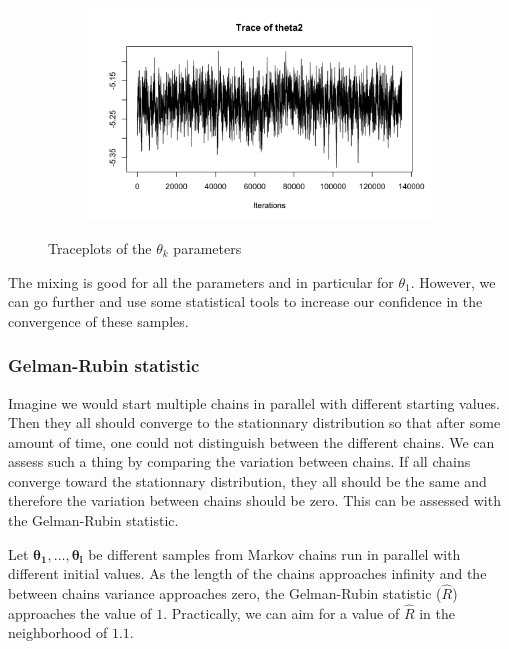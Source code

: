 \begin{figure}[H]
\begin{subfigure}{0.3\textwidth}
	\end{subfigure}
	\begin{subfigure}{0.3\textwidth}
		\centering
		\includegraphics{figures/metropolis_cw_traceplot_theta2}
	\end{subfigure}
	\caption{Traceplots of the $\theta_k$ parameters}
	\label{fig:metropolis-cw-traceplots}
\end{figure}

The mixing is good for all the parameters and in particular for $\theta_1$. However, we can go further and use some statistical tools to increase our confidence in the convergence of these samples.

\subsubsection*{Gelman-Rubin statistic}

Imagine we would start multiple chains in parallel with different starting values. Then they all should converge to the stationnary distribution so that after some amount of time, one could not distinguish between the different chains. We can assess such a thing by comparing the variation between chains. If all chains converge toward the stationnary distribution, they all should be the same and therefore the variation between chains should be zero. This can be assessed with the Gelman-Rubin statistic.

Let $\bm{\theta_1},\dots,\bm{\theta_l}$ be different samples from Markov chains run in parallel with different initial values. As the length of the chains approaches infinity and the between chains variance approaches zero, the Gelman-Rubin statistic ($\hat{R}$) approaches the value of $1$. Practically, we can aim for a value of $\hat{R}$ in the neighborhood of $1.1$.

